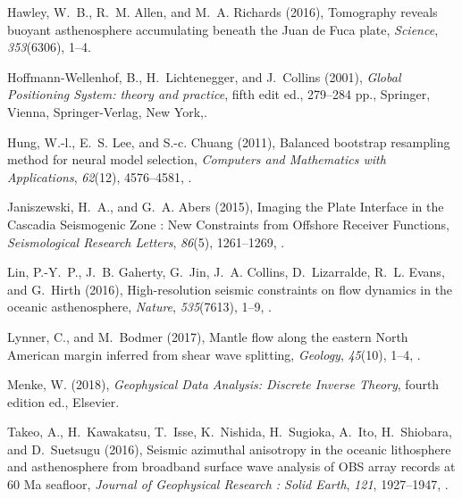 \documentclass[10pt,titlepage]{article}
\begin{document}
\begin{thebibliography}{14}
Hawley, W.~B., R.~M. Allen, and M.~A. Richards (2016), {Tomography reveals
  buoyant asthenosphere accumulating beneath the Juan de Fuca plate},
  \textit{Science}, \textit{353}(6306), 1--4.

Hoffmann-Wellenhof, B., H.~Lichtenegger, and J.~Collins (2001), \textit{{Global
  Positioning System: theory and practice}}, fifth edit ed., 279--284 pp.,
  Springer, Vienna, Springer-Verlag, New York,.

Hung, W.-l., E.~S. Lee, and S.-c. Chuang (2011), {Balanced bootstrap resampling
  method for neural model selection}, \textit{Computers and Mathematics with
  Applications}, \textit{62}(12), 4576--4581,
  .

Janiszewski, H.~A., and G.~A. Abers (2015), {Imaging the Plate Interface in the
  Cascadia Seismogenic Zone : New Constraints from Offshore Receiver
  Functions}, \textit{Seismological Research Letters}, \textit{86}(5),
  1261--1269, .

Lin, P.-Y.~P., J.~B. Gaherty, G.~Jin, J.~A. Collins, D.~Lizarralde, R.~L.
  Evans, and G.~Hirth (2016), {High-resolution seismic constraints on flow
  dynamics in the oceanic asthenosphere}, \textit{Nature}, \textit{535}(7613),
  1--9, .

Lynner, C., and M.~Bodmer (2017), {Mantle flow along the eastern North American
  margin inferred from shear wave splitting}, \textit{Geology},
  \textit{45}(10), 1--4, .

Menke, W. (2018), \textit{{Geophysical Data Analysis: Discrete Inverse
  Theory}}, fourth edition ed., Elsevier.

Takeo, A., H.~Kawakatsu, T.~Isse, K.~Nishida, H.~Sugioka, A.~Ito, H.~Shiobara,
  and D.~Suetsugu (2016), {Seismic azimuthal anisotropy in the oceanic
  lithosphere and asthenosphere from broadband surface wave analysis of OBS
  array records at 60 Ma seafloor}, \textit{Journal of Geophysical Research :
  Solid Earth}, \textit{121}, 1927--1947, .

\end{thebibliography}
\end{document}
